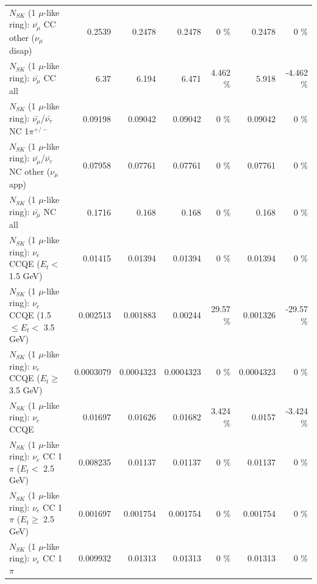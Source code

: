\begin{table}
\begin{tabular}{| l | r | r | r  r | r  r |}
        $N_{SK}$ (1 $\mu$-like ring): $\bar{\nu_\mu}$ CC other ($\nu_\mu$ disap) &          0.2539 &          0.2478 &          0.2478 &        0 \%  &          0.2478 &        0 \%  \\ 
                          $N_{SK}$ (1 $\mu$-like ring): $\bar{\nu_{\mu}}$ CC all &            6.37 &           6.194 &           6.471 &    4.462 \%  &           5.918 &   -4.462 \%  \\ 
\hline
  $N_{SK}$ (1 $\mu$-like ring): $\bar{\nu_\mu}$/$\bar{\nu_\tau}$ NC 1$\pi^{+/-}$ &         0.09198 &         0.09042 &         0.09042 &        0 \%  &         0.09042 &        0 \%  \\ 
$N_{SK}$ (1 $\mu$-like ring): $\bar{\nu_\mu}$/$\bar{\nu_\tau}$ NC other ($\nu_\mu$ app) &         0.07958 &         0.07761 &         0.07761 &        0 \%  &         0.07761 &        0 \%  \\ 
                          $N_{SK}$ (1 $\mu$-like ring): $\bar{\nu_{\mu}}$ NC all &          0.1716 &           0.168 &           0.168 &        0 \%  &           0.168 &        0 \%  \\ 
\hline
\hline
\hline
                  $N_{SK}$ (1 $\mu$-like ring): $\nu_e$ CCQE ($E_{t} <$ 1.5 GeV) &         0.01415 &         0.01394 &         0.01394 &        0 \%  &         0.01394 &        0 \%  \\ 
         $N_{SK}$ (1 $\mu$-like ring): $\nu_e$ CCQE (1.5 $\leq E_{t} <$ 3.5 GeV) &        0.002513 &        0.001883 &         0.00244 &    29.57 \%  &        0.001326 &   -29.57 \%  \\ 
               $N_{SK}$ (1 $\mu$-like ring): $\nu_e$ CCQE ($E_{t} \geq$ 3.5 GeV) &       0.0003079 &       0.0004323 &       0.0004323 &        0 \%  &       0.0004323 &        0 \%  \\ 
\hline
                                      $N_{SK}$ (1 $\mu$-like ring): $\nu_e$ CCQE &         0.01697 &         0.01626 &         0.01682 &    3.424 \%  &          0.0157 &   -3.424 \%  \\ 
\hline
             $N_{SK}$ (1 $\mu$-like ring): $\nu_e$ CC 1$\pi$ ($E_{t} <$ 2.5 GeV) &        0.008235 &         0.01137 &         0.01137 &        0 \%  &         0.01137 &        0 \%  \\ 
          $N_{SK}$ (1 $\mu$-like ring): $\nu_e$ CC 1$\pi$ ($E_{t} \geq$ 2.5 GeV) &        0.001697 &        0.001754 &        0.001754 &        0 \%  &        0.001754 &        0 \%  \\ 
\hline
                                 $N_{SK}$ (1 $\mu$-like ring): $\nu_e$ CC 1$\pi$ &        0.009932 &         0.01313 &         0.01313 &        0 \%  &         0.01313 &        0 \%  \\ 

\end{tabular}
\end{table}
